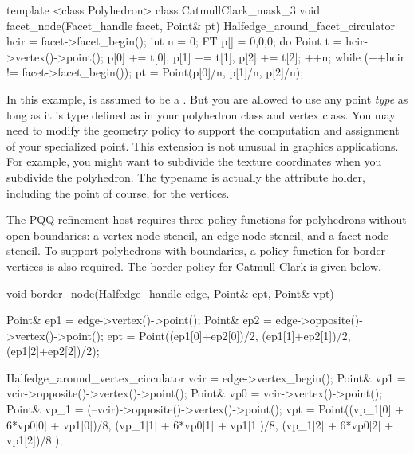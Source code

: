 \begin{ccExampleCode}
template <class Polyhedron>
class CatmullClark_mask_3 {
  void facet_node(Facet_handle facet, Point& pt) {
    Halfedge_around_facet_circulator hcir = facet->facet_begin();
    int n = 0;
    FT p[] = {0,0,0};
    do {
      Point t = hcir->vertex()->point();
      p[0] += t[0], p[1] += t[1], p[2] += t[2]; 
      ++n;
    } while (++hcir != facet->facet_begin());
    pt = Point(p[0]/n, p[1]/n, p[2]/n);
  }
}
\end{ccExampleCode}

In this example,  is assumed to be a .
But you are allowed to use any point \emph{type} as long as it is type
defined as  in your polyhedron class and vertex class.
You may need to modify the geometry policy to support the computation
and assignment of your specialized point. This extension is not unusual 
in graphics applications. For example, you might want to subdivide the
texture coordinates when you subdivide the polyhedron. The typename 
 is actually the attribute holder, including the 
point of course, for the vertices.

The PQQ refinement host requires three policy functions for 
polyhedrons without open boundaries: a vertex-node 
stencil, an edge-node stencil, and a facet-node stencil. 
To support polyhedrons with boundaries, a policy function
for border vertices is also required. The border policy for
Catmull-Clark is given below.


\begin{ccExampleCode}
  void border_node(Halfedge_handle edge, Point& ept, Point& vpt) {
    Point& ep1 = edge->vertex()->point();
    Point& ep2 = edge->opposite()->vertex()->point();
    ept = Point((ep1[0]+ep2[0])/2, (ep1[1]+ep2[1])/2, (ep1[2]+ep2[2])/2);

    Halfedge_around_vertex_circulator vcir = edge->vertex_begin();
    Point& vp1  = vcir->opposite()->vertex()->point();
    Point& vp0  = vcir->vertex()->point();
    Point& vp_1 = (--vcir)->opposite()->vertex()->point();
    vpt = Point((vp_1[0] + 6*vp0[0] + vp1[0])/8,
                (vp_1[1] + 6*vp0[1] + vp1[1])/8,
                (vp_1[2] + 6*vp0[2] + vp1[2])/8 );
  }
\end{ccExampleCode}


